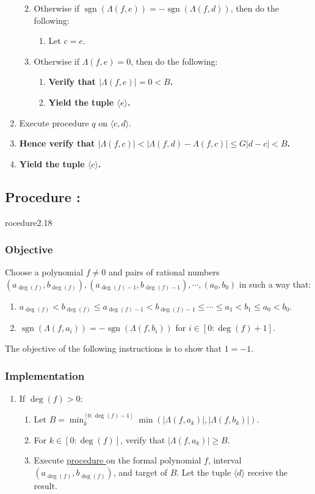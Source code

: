 \documentclass{article}
\DeclareMathOperator{\sgn}{sgn}
\newcounter{procedure}[part]
\newcommand{\procedure}[1]{\subsection*{Procedure \thepart:\theprocedure}\label{sec:procedure #1}\global\expandafter\edef\csname procedure#1\endcsname{\thepart:\theprocedure}\addtocounter{procedure}{1}}
\newcommand{\objective}{\subsubsection*{Objective}}
\newcommand{\implementation}{\subsubsection*{Implementation}}
\newcommand{\procedurehr}[1]{\hyperref[sec:procedure #1]{procedure \expandafter\csname procedure#1\endcsname}}
\begin{document}
\begin{multicols}{2}
\begin{enumerate}
\begin{enumerate}
\begin{enumerate}
						\end{enumerate}
						\item Otherwise if $\sgn(\Lambda(f,e))=-\sgn(\Lambda(f,d))$, then do the following:
						\begin{enumerate}
							\item Let $c=e$.
						\end{enumerate}
						\item Otherwise if $\Lambda(f,e)=0$, then do the following:
						\begin{enumerate}
							\item \textbf{Verify that $\lvert\Lambda(f,e)\rvert=0<B$.}
							\item \textbf{Yield the tuple $\langle e\rangle$.}
						\end{enumerate}
					\end{enumerate}
					\item Execute procedure $q$ on $\langle c,d\rangle$.
					\item \textbf{Hence verify that $\lvert\Lambda(f,c)\rvert<\lvert\Lambda(f,d)-\Lambda(f,c)\rvert\le G\lvert d-c\rvert<B$.}
					\item \textbf{Yield the tuple $\langle c\rangle$.}
				\end{enumerate}
		\procedure{2.18}
			\objective
				Choose a polynomial $f\ne 0$ and pairs of rational numbers $(a_{\deg(f)},b_{\deg(f)}),(a_{\deg(f)-1},b_{\deg(f)-1}),\cdots,(a_0,b_0)$ in such a way that:
				\begin{enumerate}
					\item $a_{\deg(f)}<b_{\deg(f)}\le a_{\deg(f)-1}<b_{\deg(f)-1}\le\cdots\le a_1<b_1\le a_0<b_0$.
					\item $\sgn(\Lambda(f,a_i))=-\sgn(\Lambda(f,b_i))$ for $i\in[0:\deg(f)+1]$.
				\end{enumerate}
				The objective of the following instructions is to show that $1=-1$.
			\implementation
				\begin{enumerate}
					\item If $\deg(f)>0$:
					\begin{enumerate}
						\item Let $B=\min_k^{[0:\deg(f)-1]}\min(\lvert\Lambda(f,a_k)\rvert,\lvert\Lambda(f,b_k)\rvert)$.
						\item For $k\in[0:\deg(f)]$, verify that $\lvert\Lambda(f,a_k)\rvert\ge B$.
						\item Execute \procedurehr{2.17} on the formal polynomial $f$, interval $(a_{\deg(f)}, b_{\deg(f)})$, and target of $B$. Let the tuple $\langle d\rangle$ receive the result.

\end{enumerate}
\end{enumerate}
\end{multicols}
\end{document}
